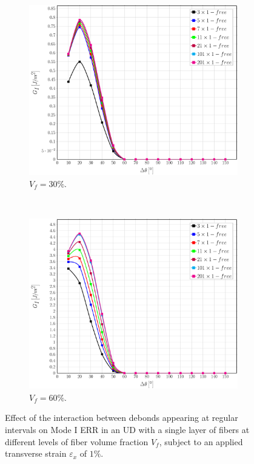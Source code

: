 \documentclass[review]{elsarticle}
\begin{document}
\begin{figure}[!h]
\centering
    \begin{subfigure}[b]{0.475\textwidth}
        \includegraphics[width=\textwidth]{sidefibers-vf30-GI.pdf}
        \caption{$V_{f}=30\%$.}\label{subfig:sidefiber30MI}
    \end{subfigure} ~
    \begin{subfigure}[b]{0.475\textwidth}
        \includegraphics[width=\textwidth]{sidefibers-vf60-GI.pdf}
        \caption{$V_{f}=60\%$.}\label{subfig:sidefiber60MI}
    \end{subfigure}

\caption{Effect of the interaction between debonds appearing at regular intervals on Mode I ERR in an UD with a single layer of fibers at different levels of fiber volume fraction $V_{f}$, subject to an applied transverse strain $\varepsilon_{x}$ of $1\%$.}\label{fig:sidefibersMI}
\end{figure}
\end{document}
